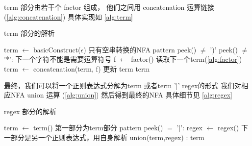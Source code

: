 \documentclass[../report]{subfiles}
\begin{document}
term 部分由若干个 factor 组成，
他们之间用 concatenation 运算链接
(\cref{alg:concatenation})
具体实现如%
\cref{alg:term}

\begin{algorithm}[H]
  \caption{term 部分的解析}
  \begin{codebox}
      \li term $\gets$ basicConstruct($\epsilon$)
        \Comment[1] 只有空串转换的NFA
      \li \While pattern  peek() $\neq$ ')'  peek() $\neq$ '*': \Comment 下一个字符不能是需要运算符号
      \Then
        \li f $\gets$ factor() \Comment 读取下一个term(\cref{alg:factor})
        \li term $\gets$  concatenation(term, f)
          \Comment 更新 term
      \End
      \li \Return term
  \end{codebox}
  \label{alg:term}
\end{algorithm}

最终，我们可以将一个正则表达式分解为term
或者term '|' regex的形式
我们对相应NFA union 运算
(\cref{alg:union})
然后得到最终的NFA
具体细节见%
\cref{alg:regex}

\begin{algorithm}[H]
  \caption{regex 部分的解析}
  \begin{codebox}
      \li term $\gets$ term() \Comment 第一部分为term部分
      \li \If pattern  peek() $=$ '|':
      \Then
        \li regex $\gets$ regex() \Comment 下一部分是另一个正则表达式，用自身解析
        \li \Return union(term,regex)
      \End
      \Else:
      \Then
        \li \Return term
      \End
  \end{codebox}
  \label{alg:regex}
\end{algorithm}
\end{document}
